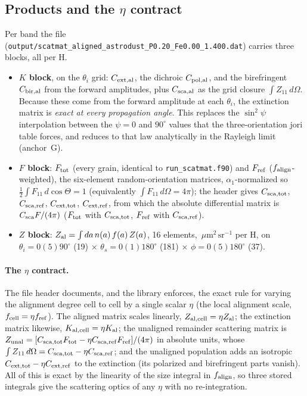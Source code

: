\documentclass{my_memo}
\newcommand{\code}[1]{\texttt{#1}}
\newcommand{\um}{\ensuremath{\,\mu\mathrm{m}}}
\begin{document}
\subsection{Products and the $\eta$ contract}\label{sec:aligned:products}

Per band the file (\code{output/scatmat\_aligned\_astrodust\_P0.20\_Fe0.00\_1.400.dat})
carries three blocks, all per H.

\begin{itemize}
\item \textbf{$K$ block}, on the $\theta_i$ grid: $C_{\rm ext,al}$, the dichroic
      $C_{\rm pol,al}$, and the birefringent $C_{\rm bir,al}$ from the forward
      amplitudes, plus $C_{\rm sca,al}$ as the grid closure $\int Z_{11}\,
      d\Omega$. Because these come from the forward amplitude at each $\theta_i$,
      the extinction matrix is \emph{exact at every propagation angle}. This
      replaces the $\sin^2\psi$ interpolation between the $\psi=0$ and $90^\circ$
      values that the three-orientation jori table forces, and reduces to that law
      analytically in the Rayleigh limit (anchor~G).
\item \textbf{$F$ block}: $F_{\rm tot}$ (every grain, identical to
      \code{run\_scatmat.f90}) and $F_{\rm ref}$ ($f_{\rm align}$-weighted), the
      six-element random-orientation matrices, $\alpha_1$-normalized so
      $\tfrac12\int F_{11}\,d\cos\Theta=1$ (equivalently $\int F_{11}\,d\Omega=
      4\pi$); the header gives $C_{\rm sca,tot}$, $C_{\rm sca,ref}$,
      $C_{\rm ext,tot}$, $C_{\rm ext,ref}$, from which the absolute differential
      matrix is $C_{\rm sca}F/(4\pi)$ ($F_{\rm tot}$ with $C_{\rm sca,tot}$,
      $F_{\rm ref}$ with $C_{\rm sca,ref}$).
\item \textbf{$Z$ block}: $Z_{\rm al}=\int da\,n(a)\,f(a)\,Z(a)$, 16 elements,
      $\um^2\,\mathrm{sr}^{-1}$ per H, on
      $\theta_i=0(5)90^\circ$ (19) $\times$ $\theta_s=0(1)180^\circ$ (181)
      $\times$ $\phi=0(5)180^\circ$ (37).
\end{itemize}

\paragraph{The $\eta$ contract.} The file header documents, and the library
enforces, the exact rule for varying the alignment degree cell to cell by a single
scalar $\eta$ (the local alignment scale, $f_{\rm cell}=\eta f_{\rm ref}$). The
aligned matrix scales linearly, $Z_{\rm al,cell}=\eta Z_{\rm al}$; the extinction
matrix likewise, $K_{\rm al,cell}=\eta K_{\rm al}$; the unaligned remainder
scattering matrix is $Z_{\rm unal}=[C_{\rm sca,tot}F_{\rm tot}-\eta C_{\rm sca,ref}
F_{\rm ref}]/(4\pi)$ in absolute units, whose $\int Z_{11}\,d\Omega=C_{\rm sca,tot}
-\eta C_{\rm sca,ref}$; and the unaligned
population adds an isotropic $C_{\rm ext,tot}-\eta C_{\rm ext,ref}$ to the
extinction (its polarized and birefringent parts vanish). All of this is exact by
the linearity of the size integral in $f_{\rm align}$, so three stored integrals
give the scattering optics of any $\eta$ with no re-integration.
\end{document}
